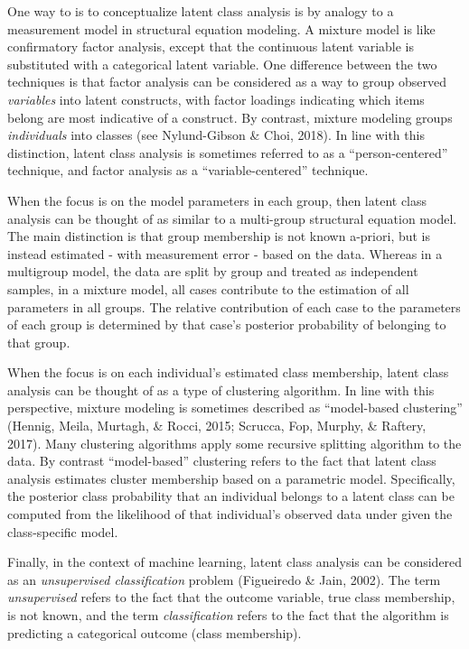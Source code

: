 \documentclass[
  ,man]{apa6}
\begin{document}
One way to is to conceptualize latent class analysis is by analogy to a measurement model in structural equation modeling.
A mixture model is like confirmatory factor analysis, except that the continuous latent variable is substituted with a categorical latent variable.
One difference between the two techniques is that factor analysis can be considered as a way to group observed \emph{variables} into latent constructs, with factor loadings indicating which items belong are most indicative of a construct.
By contrast, mixture modeling groups \emph{individuals} into classes (see Nylund-Gibson \& Choi, 2018).
In line with this distinction, latent class analysis is sometimes referred to as a ``person-centered'' technique, and factor analysis as a ``variable-centered'' technique.

When the focus is on the model parameters in each group,
then latent class analysis can be thought of as similar to a multi-group structural equation model.
The main distinction is that group membership is not known a-priori,
but is instead estimated - with measurement error - based on the data.
Whereas in a multigroup model, the data are split by group and treated as independent samples,
in a mixture model, all cases contribute to the estimation of all parameters in all groups.
The relative contribution of each case to the parameters of each group is determined by that case's posterior probability of belonging to that group.

When the focus is on each individual's estimated class membership,
latent class analysis can be thought of as a type of clustering algorithm.
In line with this perspective, mixture modeling is sometimes described as ``model-based
clustering'' (Hennig, Meila, Murtagh, \& Rocci, 2015; Scrucca, Fop, Murphy, \&
Raftery, 2017).
Many clustering algorithms apply some recursive splitting algorithm to the data.
By contrast ``model-based'' clustering refers to the fact that latent class analysis
estimates cluster membership based on a parametric model.
Specifically, the posterior class probability that an individual belongs to a latent class
can be computed from the likelihood of that individual's observed data under given the class-specific model.

Finally, in the context of machine learning, latent class analysis can be considered as an
\emph{unsupervised classification} problem (Figueiredo \& Jain, 2002).
The term \emph{unsupervised} refers to the fact that the outcome variable, true class membership,
is not known, and the term \emph{classification} refers to the fact that the algorithm is predicting a categorical outcome (class membership).
\end{document}
